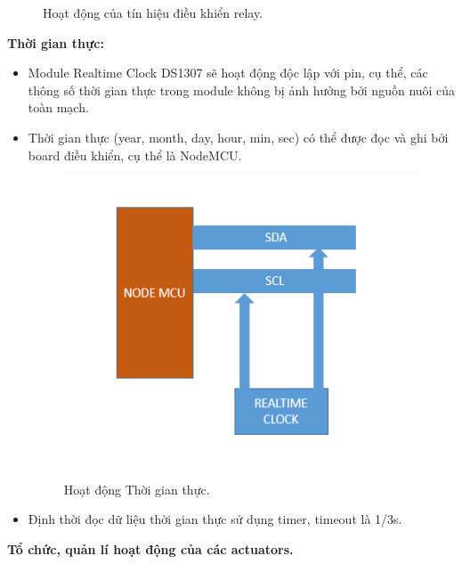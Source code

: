 \documentclass[a4paper,12pt,oneside]{article}
\begin{document}
\begin{itemize}
\begin{center}
\begin{figure}[h!]
\begin{center}
\end{center}
\caption{Hoạt động của tín hiệu điều khiển relay.}
\end{figure}
\end{center}
\end{itemize}
\noindent \textbf{Thời gian thực:}

\begin{itemize}
\item Module Realtime Clock DS1307 sẽ hoạt động độc lập với pin, cụ thể, các thông số thời gian thực trong module không bị ảnh hưởng bởi nguồn nuôi của toàn mạch.
\item Thời gian thực (year, month, day, hour, min, sec) có thể được đọc và ghi bởi board điều khiển, cụ thể là NodeMCU.

\begin{center}
\begin{figure}[h!]
\begin{center}
\includegraphics[scale=0.8]{hinh/Node_Realtime.PNG}
\end{center}
\caption{Hoạt động Thời gian thực.}
\end{figure}
\end{center}

\item Định thời đọc dữ liệu thời gian thực sử dụng timer, timeout là 1/3s.

\end{itemize}



\noindent \textbf{Tổ chức, quản lí hoạt động của các actuators.}
\end{document}
